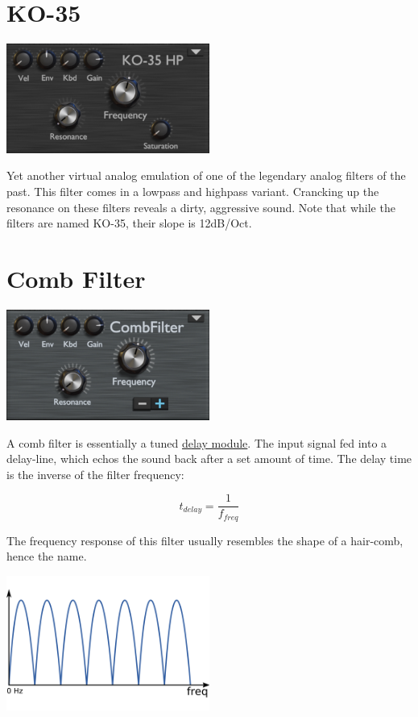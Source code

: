 \section{KO-35}
\begin{center}
    \includegraphics[width=0.5\textwidth]{graphics/korg_filter.png}
\end{center}

Yet another virtual analog emulation of one of the legendary analog filters of the past. This filter comes in a lowpass and highpass variant. Crancking up the resonance on these filters reveals a dirty, aggressive sound. Note that while the filters are named KO-35, their slope is 12dB/Oct.

\section{Comb Filter}
\begin{center}
    \includegraphics[width=0.5\textwidth]{graphics/comb_filter.png}
\end{center}

A comb filter is essentially a tuned \hyperref[delay]{delay module}. The input signal fed into a delay-line, which echos the sound back after a set amount of time. The delay time is the inverse of the filter frequency:

\begin{equation}
    t_{delay} = \frac{1}{f_{freq}}
\end{equation}

The frequency response of this filter usually resembles the shape of a hair-comb, hence the name.
\begin{center}
    \includegraphics[width=0.5\textwidth]{graphics/comb_response.png}
\end{center}

